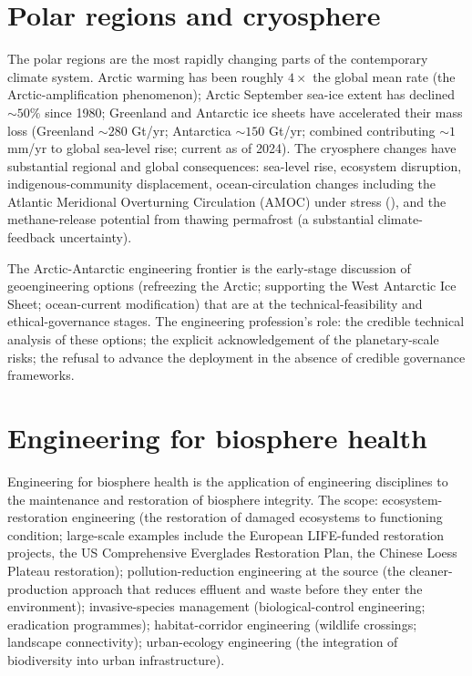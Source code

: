 \section{Polar regions and cryosphere}

The polar regions are the most rapidly changing parts of the contemporary climate system. Arctic warming has been roughly $4\times$ the global mean rate (the Arctic-amplification phenomenon); Arctic September sea-ice extent has declined $\sim 50\%$ since 1980; Greenland and Antarctic ice sheets have accelerated their mass loss (Greenland $\sim 280$ Gt/yr; Antarctica $\sim 150$ Gt/yr; combined contributing $\sim 1$ mm/yr to global sea-level rise; current as of 2024). The cryosphere changes have substantial regional and global consequences: sea-level rise, ecosystem disruption, indigenous-community displacement, ocean-circulation changes including the Atlantic Meridional Overturning Circulation (AMOC) under stress (\cite{paper:rahmstorf-amoc-2015}), and the methane-release potential from thawing permafrost (a substantial climate-feedback uncertainty).

The Arctic-Antarctic engineering frontier is the early-stage discussion of geoengineering options (refreezing the Arctic; supporting the West Antarctic Ice Sheet; ocean-current modification) that are at the technical-feasibility and ethical-governance stages. The engineering profession's role: the credible technical analysis of these options; the explicit acknowledgement of the planetary-scale risks; the refusal to advance the deployment in the absence of credible governance frameworks.

\section{Engineering for biosphere health}

Engineering for biosphere health is the application of engineering disciplines to the maintenance and restoration of biosphere integrity. The scope: ecosystem-restoration engineering (the restoration of damaged ecosystems to functioning condition; large-scale examples include the European LIFE-funded restoration projects, the US Comprehensive Everglades Restoration Plan, the Chinese Loess Plateau restoration); pollution-reduction engineering at the source (the cleaner-production approach that reduces effluent and waste before they enter the environment); invasive-species management (biological-control engineering; eradication programmes); habitat-corridor engineering (wildlife crossings; landscape connectivity); urban-ecology engineering (the integration of biodiversity into urban infrastructure).

